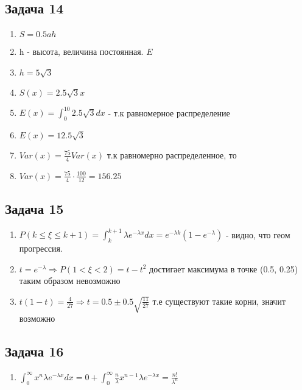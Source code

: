 \documentclass[a4paper,12pt]{article}
\begin{document}
\subsection{Задача 14}
\begin{enumerate}
    \item $S = 0.5 a h$
    \item h - высота, величина постоянная. $E$
    \item $h = 5\sqrt{3}$
    \item $S(x) = 2.5\sqrt{3}x$
    \item $E(x) = \int_{0}^{10} 2.5\sqrt{3}dx$ - т.к равномерное распределение
    \item $E(x) = 12.5\sqrt{3}$
    \item $Var(x) = \frac{75}{4} Var(x)$ т.к равномерно распределенное, то 
    \item $Var(x) = \frac{75}{4}\cdot \frac{100}{12} = 156.25$
\end{enumerate}

\subsection{Задача 15}
\begin{enumerate}
    \item $P(k \le \xi \le k+1) = \int_{k}^{k+1} \lambda e^{-\lambda x}dx = e^{-\lambda k}(1-e^{-\lambda})$ - видно, что геом прогрессия.
    \item $t = e^{-\lambda} \Rightarrow P(1<\xi < 2) = t-t^2$ достигает максимума в точке (0.5, 0.25) таким образом невозможно
    \item $t(1-t)=\frac{4}{27} \Rightarrow t = 0.5 \pm 0.5\sqrt{\frac{11}{27}}$ т.е существуют такие корни, значит возможно
\end{enumerate}

\subsection{Задача 16}
\begin{enumerate}
    \item $\int_{0}^{\infty} x^n \lambda e^{-\lambda x} dx = 0 + \int_{0}^{\infty} \frac{n}{\lambda}x^{n-1}\lambda e^{-\lambda x} = \frac{n!}{\lambda^n}$
\end{enumerate}
\end{document}
